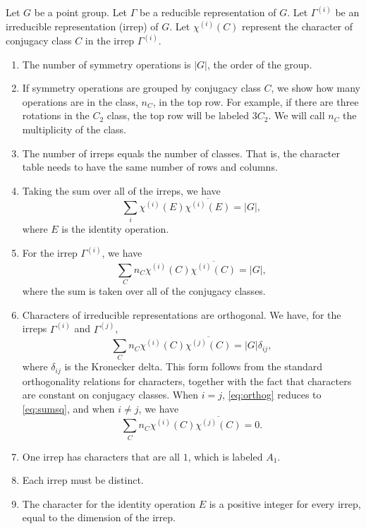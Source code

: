 \documentclass{article}
\begin{document}
    Let $G$ be a point group. Let $\Gamma$ be a reducible representation of $G$. Let $\Gamma^{(i)}$ be an irreducible representation (irrep) of $G$. Let $\chi^{(i)}(C)$ represent the character of conjugacy class $C$ in the irrep $\Gamma^{(i)}$.

    \enlargethispage{\baselineskip}
    
    \begin{enumerate}
        \item The number of symmetry operations is $|G|$, the order of the group.
        \item If symmetry operations are grouped by conjugacy class $C$, we show how many operations are in the class, $n_C$, in the top row. For example, if there are three rotations in the $C_2$ class, the top row will be labeled $3C_2$. We will call $n_C$ the multiplicity of the class.
        \item The number of irreps equals the number of classes. That is, the character table needs to have the same number of rows and columns.
        \item Taking the sum over all of the irreps, we have \[\sum_i\chi^{(i)}(E)\overline{\chi^{(i)}(E)}=|G|,\] where $E$ is the identity operation.
        \item For the irrep $\Gamma^{(i)}$, we have \begin{equation}\sum_C n_C \chi^{(i)}(C)\overline{\chi^{(i)}(C)}=|G|,\label{eq:sumsq}\end{equation} where the sum is taken over all of the conjugacy classes.
        \item \label{property:orthogonality} Characters of irreducible representations are orthogonal. We have, for the irreps $\Gamma^{(i)}$ and $\Gamma^{(j)}$, \begin{equation}
        \sum_C n_C \chi^{(i)}(C)\overline{\chi^{(j)}(C)}=|G|\delta_{ij},\label{eq:orthog}\end{equation} where $\delta_{ij}$ is the Kronecker delta. This form follows from the standard orthogonality relations for characters, together with the fact that characters are constant on conjugacy classes. When $i=j$, \eqref{eq:orthog} reduces to \eqref{eq:sumsq}, and when $i\neq j$, we have \[\sum_C n_C \chi^{(i)}(C)\overline{\chi^{(j)}(C)}=0.\]
        \item One irrep has characters that are all $1$, which is labeled $A_1$.
        \item Each irrep must be distinct.
        \item The character for the identity operation $E$ is a positive integer for every irrep, equal to the dimension of the irrep.
    \end{enumerate}
\end{document}
